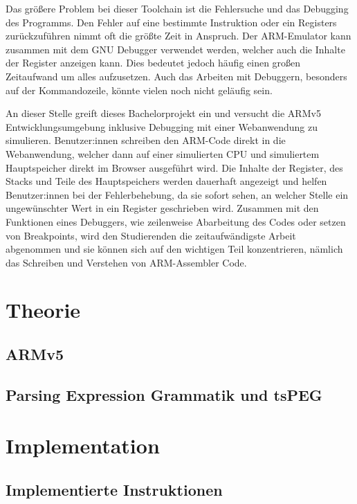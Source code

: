 \documentclass[a4paper, 11pt, onecolumn]{article}
\begin{document}
Das größere Problem bei dieser Toolchain ist die Fehlersuche und das Debugging des Programms. Den Fehler auf eine bestimmte Instruktion oder ein Registers zurückzuführen nimmt oft die größte Zeit in Anspruch. Der ARM-Emulator kann zusammen mit dem GNU Debugger \cite{gdb}  verwendet werden, welcher auch die Inhalte der Register anzeigen kann. Dies bedeutet jedoch häufig einen großen Zeitaufwand um alles aufzusetzen. Auch das Arbeiten mit Debuggern, besonders auf der Kommandozeile, könnte vielen noch nicht geläufig sein. 

An dieser Stelle greift dieses Bachelorprojekt ein und versucht die ARMv5 Entwicklungsumgebung inklusive Debugging mit einer Webanwendung zu simulieren. Benutzer:innen schreiben den ARM-Code direkt in die Webanwendung, welcher dann auf einer simulierten CPU und simuliertem Hauptspeicher direkt im Browser ausgeführt wird. Die Inhalte der Register, des Stacks und Teile des Hauptspeichers werden dauerhaft angezeigt und helfen Benutzer:innen bei der Fehlerbehebung, da sie sofort sehen, an welcher Stelle ein ungewünschter Wert in ein Register geschrieben wird. Zusammen mit den Funktionen eines Debuggers, wie zeilenweise Abarbeitung des Codes oder setzen von Breakpoints, wird den Studierenden die zeitaufwändigste Arbeit abgenommen und sie können sich auf den wichtigen Teil konzentrieren, nämlich das Schreiben und Verstehen von ARM-Assembler Code.

\section{Theorie}

\subsection{ARMv5}

\subsection{Parsing Expression Grammatik und tsPEG}

\section{Implementation}

\subsection{Implementierte Instruktionen}
\end{document}
